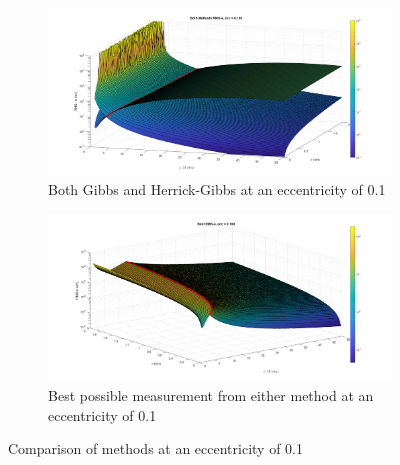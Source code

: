 \documentclass[12pt]{article}
\begin{document}
\begin{figure}[H]
	\centering
	\begin{subfigure}{.5\textwidth}
		\centering
		\includegraphics[width=1.1\textwidth]{bothMethods_e_1}
		\caption{Both Gibbs and Herrick-Gibbs at an eccentricity of 0.1}
		\label{fig:e1}
	\end{subfigure}%
	\begin{subfigure}{.5\textwidth}
		\centering
		\includegraphics[width=1.1\linewidth]{bestMethods_e_1}
		\caption{Best possible measurement from either method at an eccentricity of 0.1}
		\label{fig:e12}
	\end{subfigure}
	\caption{Comparison of methods at an eccentricity of 0.1}
	\label{fig:test2}
\end{figure}
\end{document}
